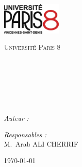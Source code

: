 \begin{titlepage}

\begin{center}

\begin{minipage}[t]{0.48\textwidth}
  \begin{flushleft}
    \includegraphics [width=30mm]{logop8.png} \\[0.5cm]
    \begin{spacing}{1.5}
      \textsc{Université Paris 8}
    \end{spacing}
  \end{flushleft}
\end{minipage}
\begin{minipage}[t]{0.48\textwidth}
  \begin{flushright}
  \end{flushright}
\end{minipage} \\[1.5cm]

\textsc{\Large \reportsubject}\\[0.5cm]
\HRule \\[0.4cm]
{\huge \bfseries \reporttitle}\\[0.4cm]
\HRule \\[1.5cm]

\begin{minipage}[t]{0.3\textwidth}
  \begin{flushleft} \large
    \emph{Auteur :}\\
    \reportauthor
  \end{flushleft}
\end{minipage}
\begin{minipage}[t]{0.6\textwidth}
  \begin{flushright} \large
    \emph{Responsables :} \\
    M.~Arab \textsc{ALI CHERRIF} \\
  \end{flushright}
\end{minipage}

\vfill

{\large \today}

\end{center}

\end{titlepage}
